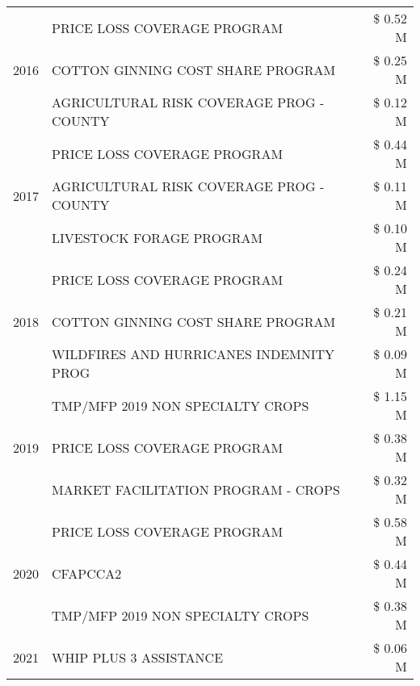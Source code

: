 \begin{tabular}{llr}
\cline{1-3}
\multirow[t]{3}{*}{2016} & PRICE LOSS COVERAGE PROGRAM                   & \$ 0.52 M \\
 & COTTON GINNING COST SHARE PROGRAM             & \$ 0.25 M \\
 & AGRICULTURAL RISK COVERAGE PROG - COUNTY      & \$ 0.12 M \\
\cline{1-3}
\multirow[t]{3}{*}{2017} & PRICE LOSS COVERAGE PROGRAM & \$ 0.44 M \\
 & AGRICULTURAL RISK COVERAGE PROG - COUNTY & \$ 0.11 M \\
 & LIVESTOCK FORAGE PROGRAM & \$ 0.10 M \\
\cline{1-3}
\multirow[t]{3}{*}{2018} & PRICE LOSS COVERAGE PROGRAM & \$ 0.24 M \\
 & COTTON GINNING COST SHARE PROGRAM & \$ 0.21 M \\
 & WILDFIRES AND HURRICANES INDEMNITY PROG & \$ 0.09 M \\
\cline{1-3}
\multirow[t]{3}{*}{2019} & TMP/MFP 2019 NON SPECIALTY CROPS & \$ 1.15 M \\
 & PRICE LOSS COVERAGE PROGRAM & \$ 0.38 M \\
 & MARKET FACILITATION PROGRAM - CROPS & \$ 0.32 M \\
\cline{1-3}
\multirow[t]{3}{*}{2020} & PRICE LOSS COVERAGE PROGRAM & \$ 0.58 M \\
 & CFAPCCA2 & \$ 0.44 M \\
 & TMP/MFP 2019 NON SPECIALTY CROPS & \$ 0.38 M \\
\cline{1-3}
2021 & WHIP PLUS 3 ASSISTANCE & \$ 0.06 M \\
\cline{1-3}
\bottomrule
\end{tabular}
